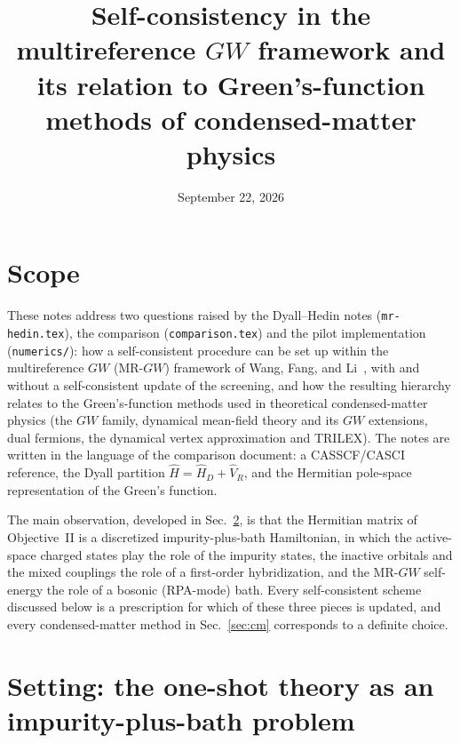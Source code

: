 \documentclass[11pt,a4paper]{article}
\title{Self-consistency in the multireference $GW$ framework and its relation
to Green's-function methods of condensed-matter physics}
\author{}
\date{September 22, 2026}
\newcommand{\GW}{$GW$}
\newcommand{\MRGW}{MR-$GW$}
\begin{document}
\maketitle

\section{Scope}

These notes address two questions raised by the Dyall--Hedin notes
(\texttt{mr-hedin.tex}), the comparison (\texttt{comparison.tex}) and the pilot
implementation (\texttt{numerics/}): how a self-consistent procedure can be
set up within the multireference \GW{} (\MRGW) framework of Wang, Fang, and
Li~\cite{WFL2026}, with and without a self-consistent update of the screening,
and how the resulting hierarchy relates to the Green's-function methods used
in theoretical condensed-matter physics (the \GW{} family, dynamical
mean-field theory and its \GW{} extensions, dual fermions, the dynamical
vertex approximation and TRILEX).  The notes are written in the language of
the comparison document: a CASSCF/CASCI reference, the Dyall partition
$\hat H=\hat H_D+\hat V_R$, and the Hermitian pole-space representation of
the Green's function.

The main observation, developed in Sec.~\ref{sec:setting}, is that the
Hermitian matrix of Objective~II is a discretized impurity-plus-bath
Hamiltonian, in which the active-space charged states play the role of the
impurity states, the inactive orbitals and the mixed couplings the role of a
first-order hybridization, and the \MRGW{} self-energy the role of a
bosonic (RPA-mode) bath.  Every self-consistent scheme discussed below is a
prescription for which of these three pieces is updated, and every
condensed-matter method in Sec.~\ref{sec:cm} corresponds to a definite choice.

\section{Setting: the one-shot theory as an impurity-plus-bath problem}
\label{sec:setting}
\end{document}
